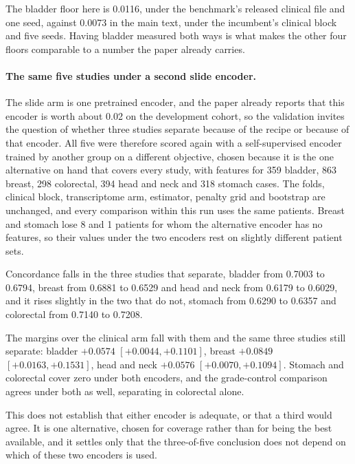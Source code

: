 \documentclass[11pt]{article}
\begin{document}
The bladder floor here is 0.0116, under the benchmark's released clinical file and one seed, against
0.0073 in the main text, under the incumbent's clinical block and five seeds. Having bladder measured both ways is what makes the
other four floors comparable to a number the paper already carries.

\paragraph{The same five studies under a second slide encoder.} The slide arm is one pretrained
encoder, and the paper already reports that this encoder is worth about 0.02 on the development
cohort, so the validation invites the question of whether three studies separate because of the
recipe or because of that encoder. All five were therefore scored again with a self-supervised
encoder trained by another group on a different objective, chosen because it is the one alternative
on hand that covers every study, with features for 359 bladder, 863 breast, 298 colorectal, 394 head
and neck and 318 stomach cases. The folds, clinical block, transcriptome arm, estimator, penalty grid
and bootstrap are unchanged, and every comparison within this run uses the same patients. Breast and
stomach lose 8 and 1 patients for whom the alternative encoder has no features, so their values under
the two encoders rest on slightly different patient sets.

Concordance falls in the three studies that separate, bladder from 0.7003 to 0.6794, breast from 0.6881 to 0.6529 and head and neck
from 0.6179 to 0.6029, and it rises slightly in the two that do not, stomach from 0.6290 to 0.6357
and colorectal from 0.7140 to 0.7208.

The margins over the clinical arm fall with them and the same three studies still separate: bladder
$+0.0574$ $[+0.0044, +0.1101]$, breast $+0.0849$ $[+0.0163, +0.1531]$, head and neck $+0.0576$
$[+0.0070, +0.1094]$. Stomach and colorectal cover zero under both encoders, and the grade-control
comparison agrees under both as well, separating in colorectal alone.

This does not establish that either encoder is adequate, or that a third would agree. It is one
alternative, chosen for coverage rather than for being the best available, and it settles only that
the three-of-five conclusion does not depend on which of these two encoders is used.
\end{document}
